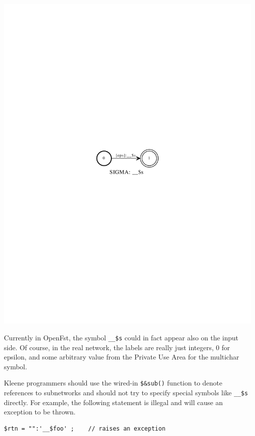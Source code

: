 \documentclass[letterpaper,12pt]{article}
\begin{document}
\begin{center}
\includegraphics{images/reference.pdf}
\end{center}

\noindent
Currently in OpenFst, the symbol \verb!__$s! could in fact appear also on
the input side.  Of course, in the real network, the labels are really
just integers, 0 for epsilon, and some arbitrary value from the Private
Use Area for the multichar symbol.

Kleene programmers should use the wired-in \verb!$&sub()! function to
denote references to subnetworks and should not try to specify special
symbols like \verb!__$s! directly.  For example, the following statement
is illegal and will cause an exception to be thrown.

\begin{Verbatim}[fontsize=\small]
$rtn = "":'__$foo' ;    // raises an exception
\end{Verbatim}
\end{document}
